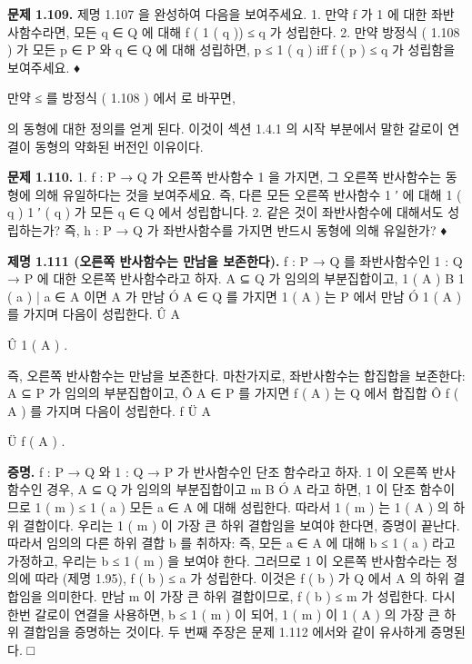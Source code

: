 \documentclass[11pt, a4paper, twoside, openany]{book}
\begin{document}
\par\medskip
\textbf{문제 1.109.}
제명 1.107 을 완성하여 다음을 보여주세요.
1. 만약 f 가 1 에 대한 좌반사함수라면, 모든 q ∈ Q 에 대해 f ( 1 ( q )) ≤ q 가 성립한다.
2. 만약 방정식 ( 1.108 ) 가 모든 p ∈ P 와 q ∈ Q 에 대해 성립하면, p ≤ 1 ( q ) iﬀ f ( p ) ≤ q 가 성립함을 보여주세요. ♦

\par\medskip
만약 ≤ 를 방정식 ( 1.108 ) 에서  로 바꾸면, 
\begin{definitionbox}[정의 1.75]
의 동형에 대한 정의를 얻게 된다. 이것이 섹션 1.4.1 의 시작 부분에서 말한 갈로이 연결이 동형의 약화된 버전인 이유이다.
\end{definitionbox}

\par\medskip
\textbf{문제 1.110.}
1. f : P → Q 가 오른쪽 반사함수 1 을 가지면, 그 오른쪽 반사함수는 동형에 의해 유일하다는 것을 보여주세요. 즉, 다른 모든 오른쪽 반사함수 1 ′ 에 대해 1 ( q )  1 ′ ( q ) 가 모든 q ∈ Q 에서 성립합니다.
2. 같은 것이 좌반사함수에 대해서도 성립하는가? 즉, h : P → Q 가 좌반사함수를 가지면 반드시 동형에 의해 유일한가? ♦

\par\medskip
\textbf{제명 1.111 (오른쪽 반사함수는 만남을 보존한다).} f : P → Q 를 좌반사함수인 1 : Q → P 에 대한 오른쪽 반사함수라고 하자. A ⊆ Q 가 임의의 부분집합이고, 1 ( A ) B { 1 ( a ) | a ∈ A } 이면 A 가 만남 Ó A ∈ Q 를 가지면 1 ( A ) 는 P 에서 만남 Ó 1 ( A ) 를 가지며 다음이 성립한다.
Û
A

\par\medskip
Û
1 ( A ) .

\par\medskip
즉, 오른쪽 반사함수는 만남을 보존한다. 마찬가지로, 좌반사함수는 합집합을 보존한다: A ⊆ P 가 임의의 부분집합이고, Ô A ∈ P 를 가지면 f ( A ) 는 Q 에서 합집합 Ô f ( A ) 를 가지며 다음이 성립한다.
f
Ü
A

\par\medskip
Ü
f ( A ) .

\par\medskip
\textbf{증명.} f : P → Q 와 1 : Q → P 가 반사함수인 단조 함수라고 하자. 1 이 오른쪽 반사함수인 경우, A ⊆ Q 가 임의의 부분집합이고 m B Ó A 라고 하면, 1 이 단조 함수이므로 1 ( m ) ≤ 1 ( a ) 모든 a ∈ A 에 대해 성립한다. 따라서 1 ( m ) 는 1 ( A ) 의 하위 결합이다. 우리는 1 ( m ) 이 가장 큰 하위 결합임을 보여야 한다면, 증명이 끝난다.
따라서 임의의 다른 하위 결합 b 를 취하자: 즉, 모든 a ∈ A 에 대해 b ≤ 1 ( a ) 라고 가정하고, 우리는 b ≤ 1 ( m ) 을 보여야 한다. 그러므로 1 이 오른쪽 반사함수라는 정의에 따라 (제명 1.95), f ( b ) ≤ a 가 성립한다. 이것은 f ( b ) 가 Q 에서 A 의 하위 결합임을 의미한다. 만남 m 이 가장 큰 하위 결합이므로, f ( b ) ≤ m 가 성립한다. 다시 한번 갈로이 연결을 사용하면, b ≤ 1 ( m ) 이 되어, 1 ( m ) 이 1 ( A ) 의 가장 큰 하위 결합임을 증명하는 것이다.
두 번째 주장은 문제 1.112 에서와 같이 유사하게 증명된다. □
\end{document}
